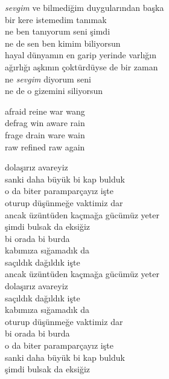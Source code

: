 \documentclass[10pt, openright, oneside]{memoir}
\theoremstyle{definition}
\begin{document}
\vspace*{\fill}
%
\newpage
{}
\vspace*{\fill}
\begin{cverse}
  \textit{sevgim} ve bilmediğim duygularından başka \\
  bir kere istemedim tanımak \\
  ne ben tanıyorum seni şimdi \\
  ne de sen ben kimim biliyorsun \\
  hayal dünyamın en garip yerinde varlığın \\
  ağırlığı aşkının çoktürdüyse de bir zaman \\
  ne \textit{sevgim} diyorum seni \\
  ne de o gizemini siliyorsun \\
\end{cverse}
\vspace*{\fill}
%
\newpage
{}
\vspace*{\fill}
\settowidth{\versewidth}{afraid reine war wang}
\begin{cverse}
  afraid reine war wang \\
  defrag win aware rain \\
  frage drain ware wain \\
  raw refined raw again \\
\end{cverse}
\vspace*{\fill}
%
\newpage
{}
\vspace*{\fill}
\settowidth{\versewidth}{ancak üzüntüden kaçmağa gücümüz yeter}
\begin{cverse}
  dolaşırız avareyiz \\
  sanki daha büyük bi kap bulduk \\
  o da biter paramparçayız işte \\
  oturup düşünmeğe vaktimiz dar \\
  ancak üzüntüden kaçmağa gücümüz yeter \\
  şimdi bulsak da eksiğiz \\
  bi orada bi burda \\
  kabımıza sığamadık da \\
  saçıldık dağıldık işte \\
  ancak üzüntüden kaçmağa gücümüz yeter \\
  dolaşırız avareyiz \\
  saçıldık dağıldık işte \\
  kabımıza sığamadık da \\
  oturup düşünmeğe vaktimiz dar \\
  bi orada bi burda \\
  o da biter paramparçayız işte \\
  sanki daha büyük bi kap bulduk \\
  şimdi bulsak da eksiğiz \\
\end{cverse}
\end{document}

